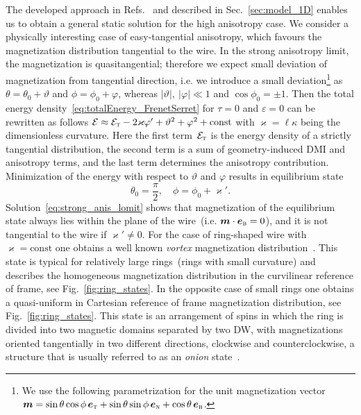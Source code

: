 The developed approach in Refs.~\cite{Sheka15,Volkov18} and described in Sec.~\ref{sec:model_1D} enables us to obtain a general static solution for the high anisotropy case. We consider a physically interesting case of easy-tangential anisotropy, which favours the magnetization distribution tangential to the wire. In the strong anisotropy limit, the magnetization is quasitangential; therefore we expect small deviation of magnetization from tangential direction, i.e. we introduce a small deviation\footnote{We use the following parametrization for the unit magnetization vector $\vec{m}=\sin\theta\cos\phi\,\vec{e}_\textsc{t}+\sin\theta\sin\phi\,\vec{e}_\textsc{n}+\cos\theta\,\vec{e}_\textsc{b}$.} as $\theta=\theta_0+\vartheta$ and $\phi=\phi_0+\varphi$, whereas $|\vartheta|,\ |\varphi|\ll1$ and $\cos\phi_0=\pm1$. Then the total energy density~\eqref{eq:totalEnergy_FrenetSerret} for $\tau=0$ and $\varepsilon = 0$ can be rewritten as follows $\mathcal{E} \approx \mathcal{E}_\textsc{t}-2\varkappa\varphi'+\vartheta^2+\varphi^2+\text{const}$ with $\varkappa=\ell\kappa$ being the dimensionless curvature. Here the first term~$\mathcal{E}_\textsc{t}$ is the energy density of a strictly tangential distribution, the second term is a sum of geometry-induced DMI and anisotropy terms, and the last term determines the anisotropy contribution. Minimization of the energy with respect to $\vartheta$ and $\varphi$ results in equilibrium state
\begin{equation}\label{eq:strong_anis_lomit}
\theta_0=\frac{\pi}{2},\quad \phi=\phi_0+\varkappa'.
\end{equation}
Solution~\eqref{eq:strong_anis_lomit} shows that magnetization of the equilibrium state always lies within the plane of the wire~(i.e. $\vec{m}\cdot\vec{e}_\textsc{b}=0$), and it is not tangential to the wire if $\varkappa'\neq0$. For the case of ring-shaped wire with $\varkappa=\text{const}$ one obtains a well known \textit{vortex} magnetization distribution~\cite{Klaui03a,Sheka15,Guimaraes17}. This state is typical for relatively large rings~(rings with small curvature) and describes the homogeneous magnetization distribution in the curvilinear reference of frame, see Fig.~\ref{fig:ring_states}. In the opposite case of small rings one obtains a quasi-uniform in Cartesian reference of frame magnetization distribution, see Fig.~\ref{fig:ring_states}. This state is an arrangement of spins in which the ring is divided into two magnetic domains separated by two DW, with magnetizations oriented tangentially in two different directions, clockwise and counterclockwise, a structure that is usually referred to as an \textit{onion} state~\cite{Klaui03a}.


